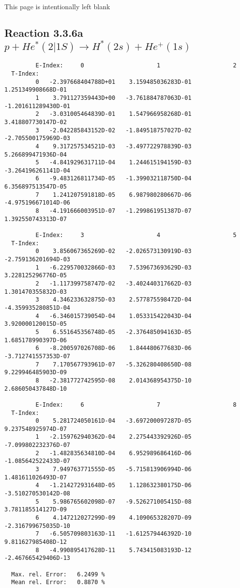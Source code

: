 \documentclass[12pt]{article}
\begin{document}
\newpage
This page is intentionally left blank
\newpage

\subsection{
Reaction 3.3.6a $   p + He^*(2|1S) \rightarrow H^*(2s) + He^+(1s) $
}


\begin{small}\begin{verbatim}
         E-Index:     0                     1                     2
  T-Index:
         0   -2.397668404788D+01    3.159485036283D-01    1.251349908668D-01
         1    3.791127359443D+00   -3.761884787063D-01   -1.201611289430D-01
         2   -3.031005464839D-01    1.547966958268D-01    3.418807730147D-02
         3   -2.042285843152D-02   -1.849518757027D-02   -2.705500175969D-03
         4    9.317257534521D-03   -3.497722978839D-03    5.266899471936D-04
         5   -4.841929631711D-04    1.244615194159D-03   -3.264196261141D-04
         6   -9.483126811734D-05   -1.399032118750D-04    6.356897513547D-05
         7    1.241207591818D-05    6.987980280667D-06   -4.975196671014D-06
         8   -4.191666003951D-07   -1.299861951387D-07    1.392550743313D-07

         E-Index:     3                     4                     5
  T-Index:
         0    3.856067365269D-02   -2.026573130919D-03   -2.759136201694D-03
         1   -6.229570032866D-03    7.539673693629D-03    3.228125296776D-05
         2   -1.117399758747D-02   -3.402440317662D-03    1.301470355832D-03
         3    4.346233632875D-03    2.577875598472D-04   -4.359935280851D-04
         4   -6.346015739054D-04    1.053315422043D-04    3.920000120015D-05
         5    6.551645356748D-05   -2.376485094163D-05    1.685178990397D-06
         6   -8.200597026708D-06    1.844480677683D-06   -3.712741557353D-07
         7    7.170567793961D-07   -5.326280408650D-08    9.229946485903D-09
         8   -2.381772742595D-08    2.014368954375D-10    2.686050437848D-10

         E-Index:     6                     7                     8
  T-Index:
         0    5.281724050161D-04   -3.697200097287D-05    9.237548925974D-07
         1   -2.159762940362D-04    2.275443392926D-05   -7.099802232376D-07
         2   -1.482835634810D-04    6.952989686416D-06   -1.085642522433D-07
         3    7.949763771555D-05   -5.715813906994D-06    1.481611026493D-07
         4   -1.214272931648D-05    1.128632380175D-06   -3.510270530142D-08
         5    5.986765602098D-07   -9.526271005415D-08    3.781185514127D-09
         6    4.147212027299D-09    4.109065328207D-09   -2.316799675035D-10
         7   -6.505709803163D-11   -1.612579446392D-10    9.811627985408D-12
         8   -4.990895417628D-11    5.743415083193D-12   -2.467665429406D-13

  Max. rel. Error:   6.2499 %
  Mean rel. Error:   0.8870 %


\end{verbatim}\end{small}
\end{document}
